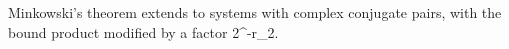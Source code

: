 Minkowski's theorem extends to systems with complex conjugate pairs, with the bound product modified by a factor 2^{-r_2}.
